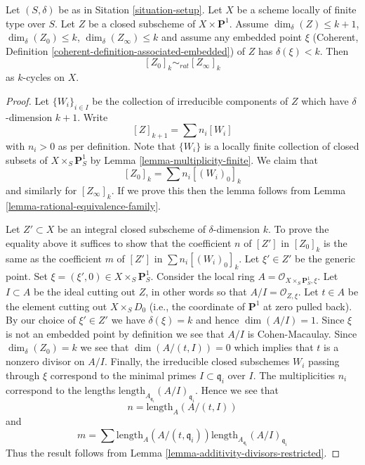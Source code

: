 \begin{lemma}
\label{lemma-closed-subscheme-cross-p1}
Let $(S, \delta)$ be as in Sitation \ref{situation-setup}.
Let $X$ be a scheme locally of finite type over $S$.
Let $Z$ be a closed subscheme of $X \times \mathbf{P}^1$.
Assume $\dim_\delta(Z) \leq k + 1$, $\dim_\delta(Z_0) \leq k$,
$\dim_\delta(Z_\infty) \leq k$ and assume
any embedded point $\xi$
(Coherent, Definition \ref{coherent-definition-associated-embedded})
of $Z$ has $\delta(\xi) < k$. Then
$$
[Z_0]_k \sim_{rat} [Z_\infty]_k
$$
as $k$-cycles on $X$.
\end{lemma}

\begin{proof}
Let $\{W_i\}_{i \in I}$ be the collection of irreducible
components of $Z$ which have $\delta$-dimension $k + 1$.
Write
$$
[Z]_{k + 1} = \sum n_i[W_i]
$$
with $n_i > 0$ as per definition. Note that $\{W_i\}$
is a locally finite collection of closed subsets of
$X \times_S \mathbf{P}^1_S$ by Lemma \ref{lemma-multiplicity-finite}.
We claim that
$$
[Z_0]_k = \sum n_i[(W_i)_0]_k
$$
and similarly for $[Z_\infty]_k$. If we prove this then the lemma
follows from Lemma \ref{lemma-rational-equivalence-family}.

\medskip\noindent
Let $Z' \subset X$ be an integral closed subscheme of $\delta$-dimension $k$.
To prove the equality above it suffices to show that the coefficient $n$
of $[Z']$ in $[Z_0]_k$ is the same as the coefficient $m$ of
$[Z']$ in $\sum n_i[(W_i)_0]_k$. Let $\xi' \in Z'$ be the generic point.
Set $\xi = (\xi', 0) \in  X \times_S \mathbf{P}^1_S$.
Consider the local ring $A = \mathcal{O}_{X \times_S \mathbf{P}^1_S, \xi}$.
Let $I \subset A$ be the ideal cutting out $Z$, in other words so that
$A/I = \mathcal{O}_{Z, \xi}$. Let $t \in A$ be the element cutting
out $X \times_S D_0$ (i.e., the coordinate of $\mathbf{P}^1$ at zero
pulled back). By our choice of $\xi' \in Z'$ we have $\delta(\xi) = k$
and hence $\dim(A/I) = 1$. Since $\xi$ is not an embedded point by
definition we see that $A/I$ is Cohen-Macaulay. Since $\dim_\delta(Z_0)
= k$ we see that $\dim(A/(t, I)) = 0$ which implies that $t$
is a nonzero divisor on $A/I$. Finally, the irreducible closed subschemes
$W_i$ passing through $\xi$ correspond to the minimal primes
$I \subset \mathfrak q_i$ over $I$. The multiplicities $n_i$ correspond
to the lengths $\text{length}_{A_{\mathfrak q_i}}(A/I)_{\mathfrak q_i}$.
Hence we see that
$$
n = \text{length}_A(A/(t, I))
$$
and
$$
m = \sum
\text{length}_A(A/(t, \mathfrak q_i)) 
\text{length}_{A_{\mathfrak q_i}}(A/I)_{\mathfrak q_i}
$$
Thus the result follows from
Lemma \ref{lemma-additivity-divisors-restricted}.
\end{proof}

